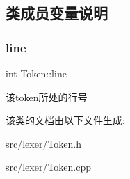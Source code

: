 \subsection{类成员变量说明}
\mbox{\label{class_token_a4b96c2a31d7c374fd2bd1986794f80dd}} 
\subsubsection{\texorpdfstring{line}{line}}
{\footnotesize\ttfamily int Token\+::line}

该token所处的行号 

该类的文档由以下文件生成\+:\begin{DoxyCompactItemize}
\item 
src/lexer/Token.\+h\item 
src/lexer/Token.\+cpp\end{DoxyCompactItemize}
